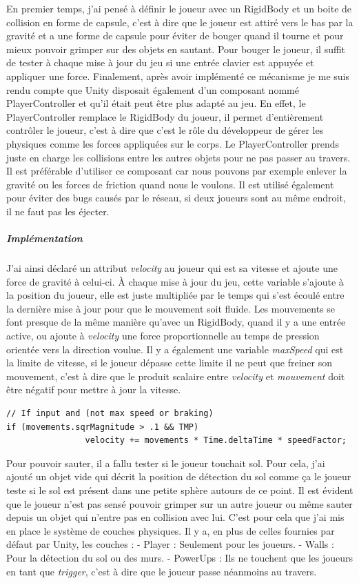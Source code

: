 \documentclass{article}
\begin{document}
En premier temps, j'ai pensé à définir le joueur avec un RigidBody et un boite de collision en forme de capsule, c'est à dire que le joueur est attiré vers le bas par la gravité et a une forme de capsule pour éviter de bouger quand il tourne et pour mieux pouvoir grimper sur des objets en sautant. Pour bouger le joueur, il suffit de tester à chaque mise à jour du jeu si une entrée clavier est appuyée et appliquer une force. Finalement, après avoir implémenté ce mécanisme je me suis rendu compte que Unity disposait également d'un composant nommé PlayerController et qu'il était peut être plus adapté au jeu. En effet, le PlayerController remplace le RigidBody du joueur, il permet d'entièrement contrôler le joueur, c'est à dire que c'est le rôle du développeur de gérer les physiques comme les forces appliquées sur le corps. Le PlayerController prends juste en charge les collisions entre les autres objets pour ne pas passer au travers. Il est préférable d'utiliser ce composant car nous pouvons par exemple enlever la gravité ou les forces de friction quand nous le voulons. Il est utilisé également pour éviter des bugs causés par le réseau, si deux joueurs sont au même endroit, il ne faut pas les éjecter.

\subparagraph{Implémentation}

J'ai ainsi déclaré un attribut \emph{velocity} au joueur qui est sa vitesse et ajoute une force de gravité à celui-ci. À chaque mise à jour du jeu, cette variable s'ajoute à la position du joueur, elle est juste multipliée par le temps qui s'est écoulé entre la dernière mise à jour pour que le mouvement soit fluide.
Les mouvements se font presque de la même manière qu'avec un RigidBody, quand il y a une entrée active, ou ajoute à \emph{velocity} une force proportionnelle au temps de pression orientée vers la direction voulue. Il y a également une variable \emph{maxSpeed} qui est la limite de vitesse, si le joueur dépasse cette limite il ne peut que freiner son mouvement, c'est à dire que le produit scalaire entre \emph{velocity} et \emph{mouvement} doit être négatif pour mettre à jour la vitesse.

\begin{lstlisting}
// If input and (not max speed or braking)
if (movements.sqrMagnitude > .1 && TMP)
                velocity += movements * Time.deltaTime * speedFactor;
\end{lstlisting}

Pour pouvoir sauter, il a fallu tester si le joueur touchait sol. Pour cela, j'ai ajouté un objet vide qui décrit la position de détection du sol comme ça le joueur teste si le sol est présent dans une petite sphère autours de ce point.
Il est évident que le joueur n'est pas sensé pouvoir grimper sur un autre joueur ou même sauter depuis un objet qui n'entre pas en collision avec lui. C'est pour cela que j'ai mis en place le système de couches physiques. Il y a, en plus de celles fournies par défaut par Unity, les couches :
- Player : Seulement pour les joueurs.
- Walls : Pour la détection du sol ou des murs.
- PowerUps : Ils ne touchent que les joueurs en tant que \emph{trigger}, c'est à dire que le joueur passe néanmoins au travers.
\end{document}

